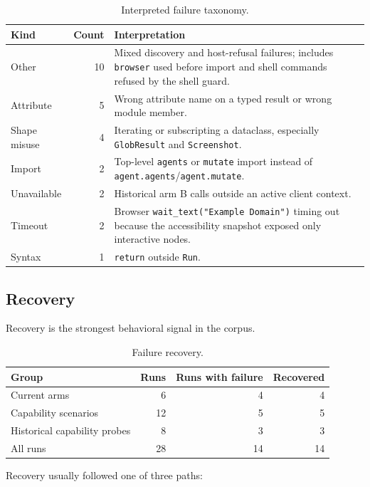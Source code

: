 \documentclass[11pt]{article}
\newcommand{\code}[1]{\texttt{#1}}
\begin{document}
\begin{table}[h]
\centering
\small
\begin{tabular}{p{2.6cm}rp{9.6cm}}
\toprule
\textbf{Kind} & \textbf{Count} & \textbf{Interpretation} \\
\midrule
Other & 10 & Mixed discovery and host-refusal failures; includes \code{browser} used before import and shell commands refused by the shell guard. \\
Attribute & 5 & Wrong attribute name on a typed result or wrong module member. \\
Shape misuse & 4 & Iterating or subscripting a dataclass, especially \code{GlobResult} and \code{Screenshot}. \\
Import & 2 & Top-level \code{agents} or \code{mutate} import instead of \code{agent.agents}/\code{agent.mutate}. \\
Unavailable & 2 & Historical arm B calls outside an active client context. \\
Timeout & 2 & Browser \code{wait\_text("Example Domain")} timing out because the accessibility snapshot exposed only interactive nodes. \\
Syntax & 1 & \code{return} outside \code{Run}. \\
\bottomrule
\end{tabular}
\caption{Interpreted failure taxonomy.}
\end{table}

\subsection{Recovery}

Recovery is the strongest behavioral signal in the corpus.

\begin{table}[h]
\centering
\begin{tabular}{lrrr}
\toprule
\textbf{Group} & \textbf{Runs} & \textbf{Runs with failure} & \textbf{Recovered} \\
\midrule
Current arms & 6 & 4 & 4 \\
Capability scenarios & 12 & 5 & 5 \\
Historical capability probes & 8 & 3 & 3 \\
\midrule
All runs & 28 & 14 & 14 \\
\bottomrule
\end{tabular}
\caption{Failure recovery.}
\end{table}

Recovery usually followed one of three paths:
\end{document}
